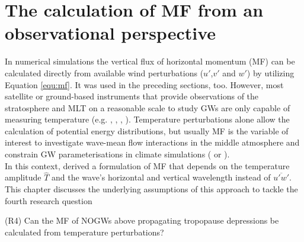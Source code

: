 \chapter{The calculation of MF from an observational perspective}
\label{sec:mf_comp}
In numerical simulations the vertical flux of horizontal momentum (MF) can be calculated directly from available wind perturbations ($u'$,$v'$ and $w'$) by utilizing Equation \ref{equ:mf}. It was used in the preceding sections, too. However, most satellite or ground-based instruments that provide observations of the stratosphere and MLT on a reasonable scale to study GWs are only capable of measuring temperature (e.g. \cite{wu_satellite_1996}, \cite[]{ern_absolute_2004}, \cite{hindley_gravity_2019}, \cite{kaifler_compact_2021}). Temperature perturbations alone allow the calculation of potential energy distributions, but usually MF is the variable of interest to investigate wave-mean flow interactions in the middle atmosphere and constrain GW parameterisations in climate simulations (\cite[]{geller_comparison_2013} or \cite[]{kim_overview_2003}). \\
In this context, \textcite[]{ern_absolute_2004} derived a formulation of MF that depends on the temperature amplitude $\hat{T}$ and the wave's horizontal and vertical wavelength instead of $\overbar{u'w'}$. This chapter discusses the underlying assumptions of this approach to tackle the fourth research question
\begin{tcolorbox}[]
    (R4) Can the MF of NOGWs above propagating tropopause depressions be calculated from temperature perturbations?
\end{tcolorbox}

